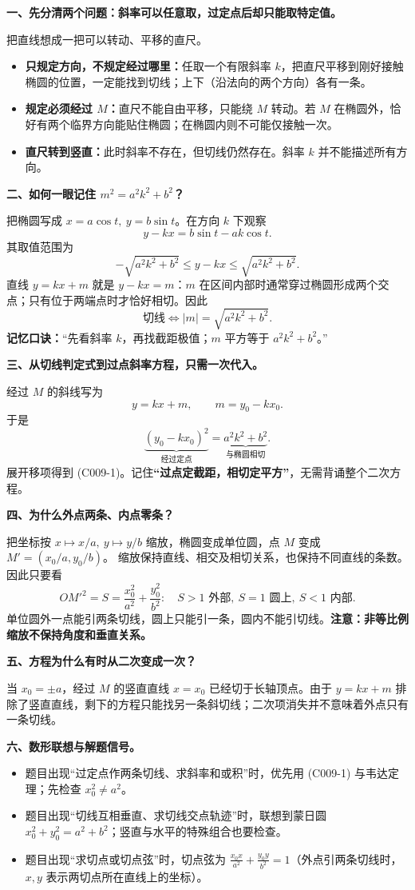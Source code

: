 \begin{explanationbox}
\textbf{一、先分清两个问题：斜率可以任意取，过定点后却只能取特定值。}

把直线想成一把可以转动、平移的直尺。
\begin{itemize}
\item \textbf{只规定方向，不规定经过哪里：}任取一个有限斜率 $k$，把直尺平移到刚好接触椭圆的位置，一定能找到切线；上下（沿法向的两个方向）各有一条。
\item \textbf{规定必须经过 $M$：}直尺不能自由平移，只能绕 $M$ 转动。若 $M$ 在椭圆外，恰好有两个临界方向能贴住椭圆；在椭圆内则不可能仅接触一次。
\item \textbf{直尺转到竖直：}此时斜率不存在，但切线仍然存在。斜率 $k$ 并不能描述所有方向。
\end{itemize}

\textbf{二、如何一眼记住 $m^2=a^2k^2+b^2$？}

把椭圆写成 $x=a\cos t,\ y=b\sin t$。在方向 $k$ 下观察
\[
y-kx=b\sin t-ak\cos t.
\]
其取值范围为
\[
-\sqrt{a^2k^2+b^2}\le y-kx\le\sqrt{a^2k^2+b^2}.
\]
直线 $y=kx+m$ 就是 $y-kx=m$：$m$ 在区间内部时通常穿过椭圆形成两个交点；只有位于两端点时才恰好相切。因此
\[
\boxed{\text{切线}\iff |m|=\sqrt{a^2k^2+b^2}.}
\]
\textbf{记忆口诀：}“先看斜率 $k$，再找截距极值；$m$ 平方等于 $a^2k^2+b^2$。”

\textbf{三、从切线判定式到过点斜率方程，只需一次代入。}

经过 $M$ 的斜线写为
\[
y=kx+m,\qquad m=y_0-kx_0.
\]
于是
\[
\underbrace{(y_0-kx_0)^2}_{\text{经过定点}}
=\underbrace{a^2k^2+b^2}_{\text{与椭圆相切}}.
\]
展开移项得到 (C009-1)。记住\textbf{“过点定截距，相切定平方”}，无需背诵整个二次方程。

\textbf{四、为什么外点两条、内点零条？}

把坐标按 $x\mapsto x/a,\ y\mapsto y/b$ 缩放，椭圆变成单位圆，点 $M$ 变成
$M'=(x_0/a,y_0/b)$。
缩放保持直线、相交及相切关系，也保持不同直线的条数。因此只要看
\[
OM'^2=S=\frac{x_0^2}{a^2}+\frac{y_0^2}{b^2}:
\quad S>1\text{ 外部},\ S=1\text{ 圆上},\ S<1\text{ 内部}.
\]
单位圆外一点能引两条切线，圆上只能引一条，圆内不能引切线。\textbf{注意：非等比例缩放不保持角度和垂直关系。}

\textbf{五、方程为什么有时从二次变成一次？}

当 $x_0=\pm a$，经过 $M$ 的竖直直线 $x=x_0$ 已经切于长轴顶点。由于 $y=kx+m$ 排除了竖直直线，剩下的方程只能找另一条斜切线；二次项消失并不意味着外点只有一条切线。

\textbf{六、数形联想与解题信号。}
\begin{itemize}
\item 题目出现“过定点作两条切线、求斜率和或积”时，优先用 (C009-1) 与韦达定理；先检查 $x_0^2\ne a^2$。
\item 题目出现“切线互相垂直、求切线交点轨迹”时，联想到蒙日圆 $x_0^2+y_0^2=a^2+b^2$；竖直与水平的特殊组合也要检查。
\item 题目出现“求切点或切点弦”时，切点弦为 $\frac{x_0x}{a^2}+\frac{y_0y}{b^2}=1$（外点引两条切线时，$x,y$ 表示两切点所在直线上的坐标）。
\end{itemize}
\end{explanationbox}
